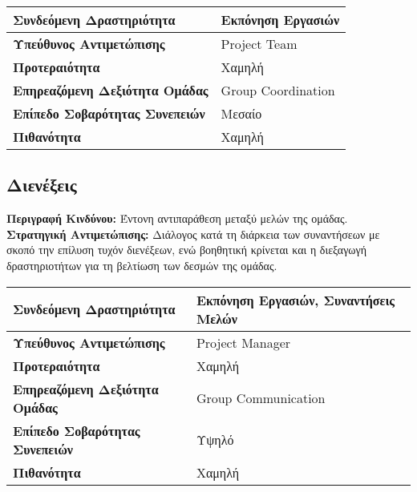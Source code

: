 \documentclass{article}
\newcommand\T{\rule{0pt}{2.6ex}}       %
\newcommand\B{\rule[-1.2ex]{0pt}{0pt}}
\begin{document}
 \begin{center}
     \begin{tabular}{|l|l|}
     \hline
      \textbf{Συνδεόμενη Δραστηριότητα}   & Εκπόνηση Εργασιών \T\B \\ 
      \hline
      \textbf{Υπεύθυνος Αντιμετώπισης} & Project Team \T\B \\
      \hline
      \textbf{Προτεραιότητα} & Χαμηλή \T\B \\
      \hline
      \textbf{Επηρεαζόμενη Δεξιότητα Ομάδας} & Group Coordination \T\B \\
      \hline
      \textbf{Επίπεδο Σοβαρότητας Συνεπειών} & Μεσαίο \T\B \\
      \hline
      \textbf{Πιθανότητα} & Χαμηλή \T\B \\
      \hline
     \end{tabular}
 \end{center}
 
 \newpage
 
 \subsection{Διενέξεις}
 
\textbf{Περιγραφή Κινδύνου:} Έντονη αντιπαράθεση μεταξύ μελών της ομάδας.\\

\textbf{Στρατηγική Αντιμετώπισης:} Διάλογος κατά τη διάρκεια των συναντήσεων με σκοπό την επίλυση τυχόν διενέξεων, ενώ βοηθητική κρίνεται και η διεξαγωγή δραστηριοτήτων για τη βελτίωση των δεσμών της ομάδας.

\vspace{0.2cm}
 
  \begin{center}
     \begin{tabular}{|l|l|}
     \hline
      \textbf{Συνδεόμενη Δραστηριότητα}   & Εκπόνηση Εργασιών, Συναντήσεις Μελών \T\B \\ 
      \hline
      \textbf{Υπεύθυνος Αντιμετώπισης} & Project Manager \T\B \\
      \hline
      \textbf{Προτεραιότητα} & Χαμηλή \T\B \\
      \hline
      \textbf{Επηρεαζόμενη Δεξιότητα Ομάδας} & Group Communication \T\B \\
      \hline
      \textbf{Επίπεδο Σοβαρότητας Συνεπειών} & Υψηλό \T\B \\
      \hline
      \textbf{Πιθανότητα} & Χαμηλή \T\B \\
      \hline
     \end{tabular}
 \end{center}
 
\end{document}
